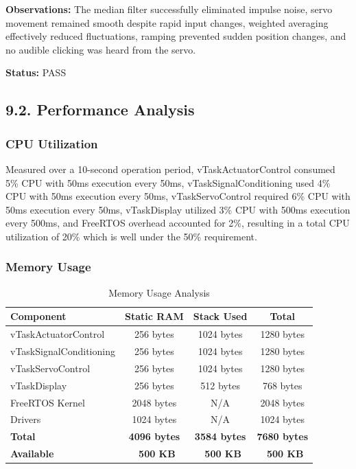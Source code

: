 \documentclass[12pt]{article}
\begin{document}
\textbf{Observations:} The median filter successfully eliminated impulse noise, servo movement remained smooth despite rapid input changes, weighted averaging effectively reduced fluctuations, ramping prevented sudden position changes, and no audible clicking was heard from the servo.

\textbf{Status:} PASS

\subsection*{9.2. Performance Analysis}

\subsubsection*{CPU Utilization}

Measured over a 10-second operation period, vTaskActuatorControl consumed 5\% CPU with 50ms execution every 50ms, vTaskSignalConditioning used 4\% CPU with 50ms execution every 50ms, vTaskServoControl required 6\% CPU with 50ms execution every 50ms, vTaskDisplay utilized 3\% CPU with 500ms execution every 500ms, and FreeRTOS overhead accounted for 2\%, resulting in a total CPU utilization of 20\% which is well under the 50\% requirement.

\subsubsection*{Memory Usage}

\begin{table}[H]
	\centering
	\caption{Memory Usage Analysis}
	\label{tab:memory-usage}
	\begin{tabular}{|l|c|c|c|}
		\hline
		\textbf{Component} & \textbf{Static RAM} & \textbf{Stack Used} & \textbf{Total} \\
		\hline
		vTaskActuatorControl & 256 bytes & 1024 bytes & 1280 bytes \\
		\hline
		vTaskSignalConditioning & 256 bytes & 1024 bytes & 1280 bytes \\
		\hline
		vTaskServoControl & 256 bytes & 1024 bytes & 1280 bytes \\
		\hline
		vTaskDisplay & 256 bytes & 512 bytes & 768 bytes \\
		\hline
		FreeRTOS Kernel & 2048 bytes & N/A & 2048 bytes \\
		\hline
		Drivers & 1024 bytes & N/A & 1024 bytes \\
		\hline
		\textbf{Total} & \textbf{4096 bytes} & \textbf{3584 bytes} & \textbf{7680 bytes} \\
		\hline
		\textbf{Available} & \textbf{~500 KB} & \textbf{~500 KB} & \textbf{~500 KB} \\
		\hline
	\end{tabular}
\end{table}
\end{document}
